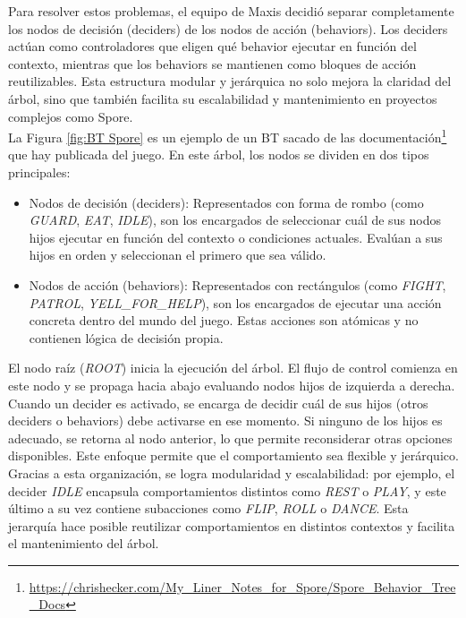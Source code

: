 Para resolver estos problemas, el equipo de Maxis decidió separar completamente los nodos de decisión (deciders) de los nodos de acción (behaviors). Los deciders actúan como controladores que eligen qué behavior ejecutar en función del contexto, mientras que los behaviors se mantienen como bloques de acción reutilizables. Esta estructura modular y jerárquica no solo mejora la claridad del árbol, sino que también facilita su escalabilidad y mantenimiento en proyectos complejos como Spore.\\

La Figura \ref{fig:BT Spore} es un ejemplo de un BT sacado de las documentación\footnote{ \url{https://chrishecker.com/My_Liner_Notes_for_Spore/Spore_Behavior_Tree_Docs}} que hay publicada del juego.
En este árbol, los nodos se dividen en dos tipos principales:
\begin{itemize}
\item Nodos de decisión (deciders): Representados con forma de rombo (como \textit{GUARD}, \textit{EAT}, \textit{IDLE}), son los encargados de seleccionar cuál de sus nodos hijos ejecutar en función del contexto o condiciones actuales. Evalúan a sus hijos en orden y seleccionan el primero que sea válido.
\item Nodos de acción (behaviors): Representados con rectángulos (como \textit{FIGHT}, \textit{PATROL}, \textit{YELL\_FOR\_HELP}), son los encargados de ejecutar una acción concreta dentro del mundo del juego. Estas acciones son atómicas y no contienen lógica de decisión propia.
\end{itemize}

El nodo raíz (\textit{ROOT}) inicia la ejecución del árbol. El flujo de control comienza en este nodo y se propaga hacia abajo evaluando nodos hijos de izquierda a derecha. Cuando un decider es activado, se encarga de decidir cuál de sus hijos (otros deciders o behaviors) debe activarse en ese momento. Si ninguno de los hijos es adecuado, se retorna al nodo anterior, lo que permite reconsiderar otras opciones disponibles. Este enfoque permite que el comportamiento sea flexible y jerárquico.\\

Gracias a esta organización, se logra modularidad y escalabilidad: por ejemplo, el decider \textit{IDLE} encapsula comportamientos distintos como \textit{REST} o \textit{PLAY}, y este último a su vez contiene subacciones como \textit{FLIP}, \textit{ROLL} o \textit{DANCE}. Esta jerarquía hace posible reutilizar comportamientos en distintos contextos y facilita el mantenimiento del árbol.

